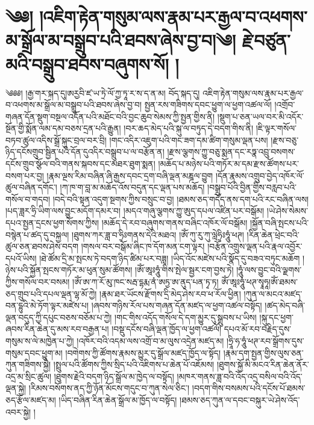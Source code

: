 \setcounter{footnote}{0} 
\chapter{༄༅། །འཇིག་རྟེན་གསུམ་ལས་རྣམ་པར་རྒྱལ་བ་འཕགས་མ་སྒྲོལ་མ་བསྒྲུབ་པའི་ཐབས་ཞེས་བྱ་བ།༄། རྗེ་བཙུན་མའི་བསྒྲུབ་ཐབས་བཞུགས་སོ། ། }༄༅༅། །རྒྱ་གར་སྐད་དུ།ཨརྱབི་ཛ་ཡ་ཏྲེ་ལོ་ཀྱ་ཏཱ་ར་ས་ད་ན་མ། བོད་སྐད་དུ། འཇིག་རྟེན་གསུམ་ལས་རྣམ་པར་རྒྱལ་བ་འཕགས་མ་སྒྲོལ་མ་བསྒྲུབ་པའི་ཐབས་ཞེས་བྱ་བ། སྤྱན་རས་གཟིགས་དབང་ཕྱུག་ལ་ཕྱག་འཚལ་ལོ། །འགྲོབ་གཞན་དོན་སྡུག་བསྔལ་འདོན་པའི་མཐོང་བའི་བྱང་ཆུབ་སེམས་ཀྱི་སྤྱན་གྱིས་ནི། །སྡུག་པ་ཅན་ཡལ་བར་མི་འདོར་སྔོན་གྱི་སྨོན་ལམ་དམ་བཅས་དྲན་པའི་རྒྱུན། །བར་ཆད་མེད་པའི་སྐུ་ལ་བཏུད་དེ་བདག་གིས་ནི། །ཇི་ལྟར་གསོལ་བཏབ་ཚུལ་འདིས་སྒྲོ་སྐུང་བྲལ་བར་བྲི། །གང་འདིར་འཇུག་པའི་གང་ཟག་དམ་ཚིག་གསུམ་ལྡན་པས། །རྫས་བཅུ་ཉིད་དངོསགྲུབ་སྦྱིན་པའི་དོན་དུའདིར་བསྒྲུབ་པ་ལ་བརྩོན་ན། །རྫས་ལྕགས་ཀྱུ་བཅུ་སྨན་དང་རཏྣ་འབྲུ་བསགས་དངོས་གྲུབ་སྩོལ་བའི་གནས་སྐབས་དང་མཐར་ཐུག་སྨན། །མཆོད་པ་མཉེས་པའི་གཏོར་མ་དམ་རྫས་ཚོགས་པར་བསག་པར་བྱ། །རྣམ་ལྔས་རིམ་བཞིན་ཞི་རྒྱས་དབང་དྲག་བཞི་ལྡན་མཎྜལ་བྱུག །དོན་རྣམས་འགྲུབ་བྱེད་འཁོར་ལོ་ཚུལ་བཞིན་དགོང་། །ཀ་ཁ་ག་བླ་མ་མཆོད་འོས་བདུན་དང་ལྡན་པས་མཆོད། །བསྒྲུབ་པོའི་བྱིན་གྱིས་བརླབ་པའི་གསོལ་བ་གདབ། །བདེ་བའི་སྟན་འདུག་སྔགས་ཀྱིས་བསྲུང་བ་བྱ། །ཐམས་ཅད་གདོད་ནས་དག་པའི་རང་བཞིན་ལས། །པད་ཟླར་ཧྲི་ཡིག་ལས་བྱུང་མདོག་དམར་བ། །མདའ་གཞུ་ལྕགས་ཀྱུ་ཨུད་དཔལ་འཛིན་པར་བསྒོམ། །ཡེ་ཤེས་སེམས་དཔའ་སྤྱན་དྲངས་ཕྱག་སོགས་ཀྱིས། །མཆོད་དེ་རབ་བཞུགས་གནས་བཞིང་འཁོར་ལོ་བསྒོམ། །སྐྱོན་བཞི་སྤངས་པའི་བསྙེན་པ་ཚད་དུ་བསྐྱལ། །ཐུགས་ཀར་ཟླ་བ་ཧྲིཿགནས་དེའི་མཐའ། །ཨོཾ་ཀུ་རུ་ཀུ་ལླེཧྲིཿཧཱུཾ་ཕཊ། །རིན་ཆེན་ཕྲེང་བའི་ཚུལ་ཅན་ཐབས་ཤེས་བདག །གསལ་བར་བསྒོམ་ཞིང་ཁ་དོག་མན་ངག་ལྟར། །བརྩོན་འགྲུས་ལྡན་པའི་རྣལ་འབྱོར་དཔའོ་ཡིས། །ཐེ་ཚོམ་དྲི་མ་སྤངས་ཏེ་བདག་ཉིད་ཚིམ་པར་བཟླ། །ཡིད་འོང་མཛེས་པའི་སྣོད་དུ་བཟའ་བཏུང་མཆོག །ཉེས་པའི་སྐྱོན་སྤངས་གཏོར་མ་ཕུན་སུམ་ཚོགས། །ཨོཾ་ཨཱཿཧཱུཾ་གིས་སྤེལ་སྦྱར་ངག་བྱས་ཏེ། །ཧཱུཾ་ལས་བྱུང་བའི་ལྗགས་ཀྱིས་གསོལ་བར་བསམ། །ཨོཾ་ཨ་ཀ་རོ་མུ་ཁང་སརྦ་དྷརྨ་ནཾ་ཨཏྱ་ཨ་ནུད་པན་ཏྭ་ཏ། ཨོཾ་ཨཱཿཧཱུཾ་ཕཊ་སྭཱཧཱ།ཨོཾ་ཐམས་ཅད་གྲུབ་པའི་དཔལ་ལྡན་ལྷ་མོ་ཀྱེ། །རྣམ་ཐར་ཡོངས་རྫོགས་དྲི་མེད་ཤེས་རབ་ཕ་རོལ་ཕྱིན། །ཀུན་ལ་མངའ་མཛད་བན་དྷུའི་མེ་ཏོག་ལྟར་མཛེས་པ། །ཞབས་གཉིས་རོལ་པས་གཞན་དོན་མཛད་ལ་ཕྱག་འཚལ་བསྟོད། །ཚད་མེད་བཞི་ལྡན་བདུད་ཀྱི་དཔུང་བཅས་བཅོམ་པ་ཀྱེ། །གང་གིས་འདོད་གསོལ་དེ་དག་མྱུར་དུ་སྒྲུབས་པ་ཡིས། །སྐུ་དང་ཕྱག་ཞབས་རིན་ཆེན་དུ་མས་རབ་བརྒྱན་པ། །བསྡུ་དངོས་བཞི་ལྡན་ཁྱོད་ལ་ཕྱག་འཚལོ། དཔའ་མོ་རབ་བརྗིད་དུས་གསུམ་ས་ལེ་མཁྱེན་པ་ཀྱེ། །འཁོར་བའི་འདམ་ལས་འགྲོ་བ་མ་ལུས་འདྲེན་མཛད་མ། །ཧྲཱི་ཧ་ཧཱུཾ་ཕཊ་རབ་སྒྲོགས་དུས་གསུམ་དབང་ཕྱུག་མ། །བགེགས་ཀྱི་ཚོགས་རྣམས་མྱུར་དུ་སྒྲོལ་མཛད་ཁྱོད་ལ་སྟོད། །རྣམ་དག་སྤྱན་གྱིས་ལུས་ཅན་ཀུན་གཟིགས་སྐྱཻ། །སྤྲུལ་པའི་ཚོགས་ཀྱིས་སྲིད་པའི་འཇིགས་པ་ཆེན་པོ་འཇོམས། །ཐུགས་སྐྱོ་མི་མངའ་རིན་ཆེན་ནོར་འདྲ་མ་སྲིང་ཚུལ། །ཐུགས་རྗེའི་བདག་ཉིད་སྒྲོལ་མ་ཁྱེད་ལ་བསྟོད། །མཁར་གནས་ཟླ་བའི་འོད་འདྲ་བསིལ་བའི་འོད་ལྡན་སྐྱེ། །རིམས་བསོགས་ནད་ཀྱི་ཉོན་མོངས་གདུང་བ་ཀུན་སེལ་ཅིང་། །བདག་གིས་བསམས་པའི་དངོས་པོ་ཐམས་ཅད་རྩོལ་མཛད་མ། །ཡིད་བཞིན་རིན་ཆེན་སྒྲོལ་མ་ཁྱོད་ལ་བསྟོད། །ཐམས་ཅད་ཀུན་ལ་དབང་བསྐུར་ཡེ་ཤེས་འོད་འབར་སྐྱེ། །
